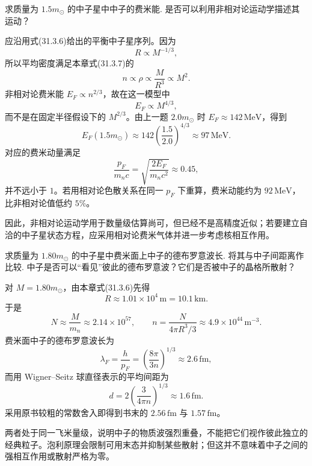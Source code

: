 \begin{exercise}\label{ex:31.4}
求质量为 $1.5 m_\odot$ 的中子星中中子的费米能. 是否可以利用非相对论运动学描述其运动？
\end{exercise}
\begin{solution}
应沿用式(31.3.6)给出的平衡中子星序列。因为
\[
R\propto M^{-1/3},
\]
所以平均密度满足本章式(31.3.7)的
\[
n\propto\rho\propto\frac{M}{R^3}\propto M^2.
\]
非相对论费米能 $E_F\propto n^{2/3}$，故在这一模型中
\[
E_F\propto M^{4/3},
\]
而不是在固定半径假设下的 $M^{2/3}$。由上一题 $2.0m_\odot$ 时 $E_F\approx142\,\mathrm{MeV}$，得到
\[
\boxed{E_F(1.5m_\odot)\approx142\left(\frac{1.5}{2.0}\right)^{4/3}
\approx97\,\mathrm{MeV}}.
\]
对应的费米动量满足
\[
\frac{p_F}{m_nc}=\sqrt{\frac{2E_F}{m_nc^2}}\approx0.45,
\]
并不远小于 $1$。若用相对论色散关系在同一 $p_F$ 下重算，费米动能约为 $92\,\mathrm{MeV}$，比非相对论值低约 $5\%$。

因此，非相对论运动学用于数量级估算尚可，但已经不是高精度近似；若要建立自洽的中子星状态方程，应采用相对论费米气体并进一步考虑核相互作用。
\end{solution}

\begin{exercise}\label{ex:31.5}
求质量为 $1.80 m_\odot$ 的中子星中费米面上中子的德布罗意波长. 将其与中子间距离作比较. 中子是否可以“看见”彼此的德布罗意波？它们是否被中子的晶格所散射？
\end{exercise}
\begin{solution}
对 $M=1.80m_\odot$，由本章式(31.3.6)先得
\[
R\approx1.01\times10^4\,\mathrm m=10.1\,\mathrm{km}.
\]
于是
\[
N\approx\frac{M}{m_n}\approx2.14\times10^{57},\qquad
n=\frac{N}{4\pi R^3/3}\approx4.9\times10^{44}\,\mathrm{m^{-3}}.
\]
费米面中子的德布罗意波长为
\[
\lambda_F=\frac{h}{p_F}
=\left(\frac{8\pi}{3n}\right)^{1/3}
\approx\boxed{2.6\,\mathrm{fm}},
\]
而用 Wigner--Seitz 球直径表示的平均间距为
\[
d=2\left(\frac{3}{4\pi n}\right)^{1/3}
\approx\boxed{1.6\,\mathrm{fm}}.
\]
采用原书较粗的常数舍入即得到书末的 $2.56\,\mathrm{fm}$ 与 $1.57\,\mathrm{fm}$。

两者处于同一飞米量级，说明中子的物质波强烈重叠，不能把它们视作彼此独立的经典粒子。泡利原理会限制可用末态并抑制某些散射；但这并不意味着中子之间的强相互作用或散射严格为零。
\end{solution}

